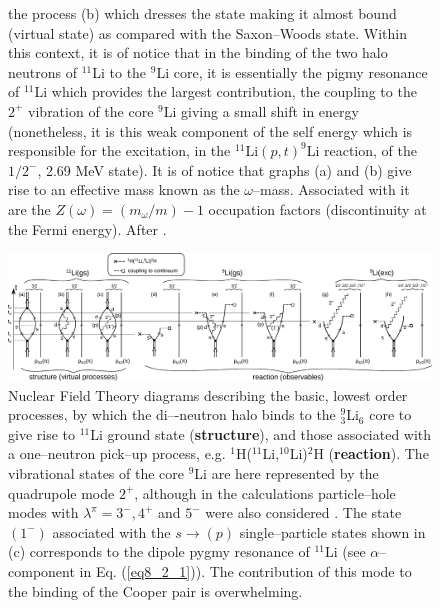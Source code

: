 \begin{figure}
{the process (b) which dresses the state making it almost bound (virtual state) as compared with the Saxon–Woods state.
Within this context, it is of notice that in the binding of the two halo neutrons of $^{11}$Li to the $^9$Li core, it is essentially the
pigmy resonance of $^{11}$Li which provides the largest contribution, the coupling to the $2^+$ vibration of the core $^9$Li giving a
small shift in energy (nonetheless, it is this weak component of the self energy which is responsible for the excitation, in the
$^{11}$Li$(p, t)^9$Li reaction, of the $1/2^−$, 2.69 MeV state).  It is of notice that graphs (a) and (b) give rise to an effective mass known as the $\omega$--mass. Associated with it are the
$Z(\omega) = (m_\omega/m)-1$ occupation factors (discontinuity at the Fermi energy). After \cite{Potel:14}.}\label{fig6.2.4x}
\end{figure}
 \begin{figure}
\centerline{\includegraphics*[width=19 cm,angle=0]{C6/figs_C6/diagrams}}
\caption{Nuclear Field Theory diagrams describing the basic, lowest order processes, by which the di–-neutron halo binds to the $^9_3$Li$_6$ core to give rise to $^{11}$Li ground state 
(\textbf{structure}), and those associated with a one--neutron pick--up process, e.g.  $^1$H($^{11}$Li,$^{10}$Li)$^2$H (\textbf{reaction}). The vibrational states of the core $^9$Li are here represented by the quadrupole mode $2^+$, although in the calculations particle--hole modes with $\lambda^{\pi}=3^-,4^+$ and $5^-$ were also considered . The state $(1^-)$ associated with the $s\rightarrow(p)$ single--particle states shown in (c) corresponds to the  dipole pygmy resonance of $^{11}$Li (see $\alpha$--component in Eq. (\ref{eq8_2_1})). The contribution of this mode to the binding of the Cooper pair is overwhelming.}\label{fig6.1.4x}
\end{figure}
